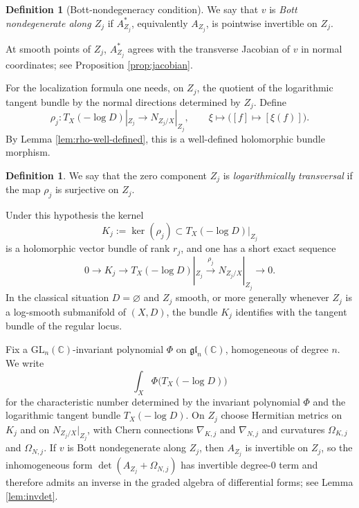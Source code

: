 \documentclass[12pt,a4paper,dvipsnames,x11names]{amsart}
\numberwithin{equation}{section}
\theoremstyle{plain}
\theoremstyle{definition}
\newtheorem{definition}[theorem]{Definition}
\theoremstyle{remark}
\newcommand{\CC}{\mathbb C}
\newcommand{\GL}{\mathrm{GL}}
\begin{document}
\begin{definition}[Bott-nondegeneracy condition]\label{def:nondeg-intro}
We say that $v$ is \emph{Bott nondegenerate along $Z_j$} if $A_{Z_j}^*$, equivalently $A_{Z_j}$, is pointwise invertible on $Z_j$.
\end{definition}

At smooth points of $Z_j$, $A_{Z_j}^*$ agrees with the transverse Jacobian of $v$ in normal coordinates; see Proposition \ref{prop:jacobian}.

For the localization formula one needs, on $Z_j $, the quotient of the logarithmic tangent bundle by the normal directions determined by $Z_j$. Define
\begin{equation}\label{eq:rho-map-intro}
\rho_j:T_X(-\log D)|_{Z_j }\longrightarrow N_{Z_j/X}|_{Z_j },
\qquad
\xi\longmapsto \big([f]\mapsto [\xi(f)]\big).
\end{equation}
By Lemma \ref{lem:rho-well-defined}, this is a well-defined holomorphic bundle morphism.

\begin{definition} \label{def:surj-intro}
We say that the zero component $Z_j$ is \emph{logarithmically transversal} if the map $\rho_j$ is surjective on $Z_j $.
\end{definition}

Under this hypothesis the kernel
\begin{equation}\label{eq:Kj-intro}
K_j:=\ker(\rho_j)\subset T_X(-\log D)|_{Z_j }
\end{equation}
is a holomorphic vector bundle of rank $r_j$, and one has a short exact sequence
\begin{equation}\label{eq:exact-KN-intro}
0\longrightarrow K_j\longrightarrow T_X(-\log D)|_{Z_j }\xrightarrow{\ \rho_j\ }N_{Z_j/X}|_{Z_j }\longrightarrow 0.
\end{equation}
In the classical situation $D=\varnothing$ and $Z_j$ smooth, or more generally whenever $Z_j $ is a log-smooth submanifold of $(X,D)$, the bundle $K_j$ identifies with the tangent bundle of the regular locus. 

 

Fix a $\GL_n(\CC)$-invariant polynomial $\Phi$ on $\mathfrak{gl}_n(\CC)$, homogeneous of degree $n$.
We write
\begin{equation}\label{eq:CW-notation-intro}
\int_X \Phi\bigl(T_X(-\log D)\bigr)
\end{equation}
for the characteristic number determined by the invariant polynomial $\Phi$ and the logarithmic tangent bundle $T_X(-\log D)$.
On $Z_j $ choose Hermitian metrics on $K_j$ and on $N_{Z_j/X}|_{Z_j }$, with Chern connections $\nabla_{K,j}$ and $\nabla_{N,j}$ and curvatures $\Omega_{K,j}$ and $\Omega_{N,j}$.
If $v$ is Bott nondegenerate along $Z_j$, then $A_{Z_j}$ is invertible on $Z_j $, so the inhomogeneous form $\det(A_{Z_j}+\Omega_{N,j})$ has invertible degree-$0$ term and therefore admits an inverse in the graded algebra of differential forms; see Lemma \ref{lem:invdet}.
\end{document}
